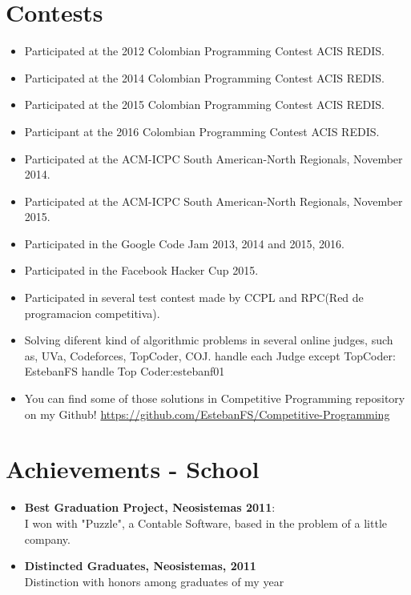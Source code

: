 \documentclass[a4paper,10pt]{article} %
\begin{document}
\section{Contests}
\begin{itemize}
 \item Participated at the 2012 Colombian Programming Contest ACIS REDIS.
 \item Participated at the 2014 Colombian Programming Contest ACIS REDIS.
 \item Participated at the 2015 Colombian Programming Contest ACIS REDIS.
 \item Participant at the 2016 Colombian Programming Contest ACIS REDIS.
 \item Participated at the ACM-ICPC South American-North Regionals, November 2014.
 \item Participated at the ACM-ICPC South American-North Regionals, November 2015.
 \item Participated in the Google Code Jam 2013, 2014 and 2015, 2016.
 \item Participated in the Facebook Hacker Cup 2015.
 \item Participated in several test contest made by CCPL and RPC(Red de programacion competitiva).
 \item Solving diferent kind of algorithmic problems in several online judges, such as,
UVa, Codeforces, TopCoder, COJ.
handle each Judge except TopCoder: EstebanFS
handle Top Coder:estebanf01
\item You can find some of those solutions in Competitive Programming repository on my Github! \href{https://github.com/EstebanFS/Competitive-Programming}{https://github.com/EstebanFS/Competitive-Programming}
\end{itemize}


\section{Achievements - School}
\begin{itemize}
\item \textbf{Best Graduation Project, Neosistemas 2011}:\\
I won with "Puzzle", a Contable Software, based in the problem of a little company.
\item \textbf{Distincted Graduates, Neosistemas, 2011}\\
Distinction with honors among graduates of my year
\end{itemize}
\end{document}
